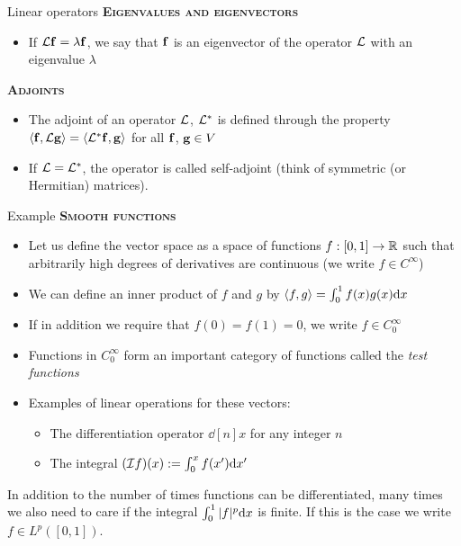 \begin{frame}{Linear operators}	
	\textbf{\textsc{Eigenvalues and eigenvectors}}
	\begin{itemize}
		\item If $ \mathcal{L} \mathbf{f} = \lambda \mathbf{f} $, we say that $ \mathbf{f} $ is an \alert{eigenvector} of the operator $ \mathcal{L} $ with an \alert{eigenvalue} $ \lambda $
	\end{itemize}
	\textbf{\textsc{Adjoints}}
	\begin{itemize}
		\item The adjoint of an operator $ \mathcal{L} $, $ \mathcal{L}^* $ is defined through the property $ \langle \mathbf{f},\mathcal{L} \mathbf{g} \rangle = \langle \mathcal{L}^* \mathbf{f}, \mathbf{g} \rangle $ for all $ \mathbf{f} $, $ \mathbf{g} \in V $
		\item If $ \mathcal{L} = \mathcal{L}^* $, the operator is called self-adjoint
		(think of symmetric (or Hermitian) matrices).
	\end{itemize}
\end{frame}


\begin{frame}{Example \examplen}	
	\textbf{\textsc{Smooth functions}}
	\begin{itemize}
		\item Let us define the vector space as a space of functions $ f: [0,1] \to \mathbb{R} $ such that arbitrarily high degrees of derivatives are continuous (we write $ f\in C^\infty $)
		\item We can define an inner product of $ f $ and $ g $ by $ \langle f,g \rangle = \int_{0}^{1} f(x)g(x) \mathrm{d} x $
		\item If in addition we require that $ f(0)=f(1)=0 $, we write $ f \in C^\infty_0 $
		\item Functions in $ C^\infty_0 $ form an important category of functions called the \emph{test functions}
		\item Examples of linear operations for these vectors:
		\begin{itemize}
			\item The differentiation operator $ \dd[n]{}{x} $ for any integer $ n $
			\item The integral $ (\mathcal{I} f)(x) := \int_{0}^{x} f(x') \mathrm{d} x' $
		\end{itemize}
	\end{itemize}
{\color{olive} In addition to the number of times functions can be differentiated, many times we also need to care if the integral $ \int_{0}^{1} |f|^p \mathrm{d} x  $ is finite. If this is the case we write $ f \in L^p([0,1]) $. 
}
\end{frame}


